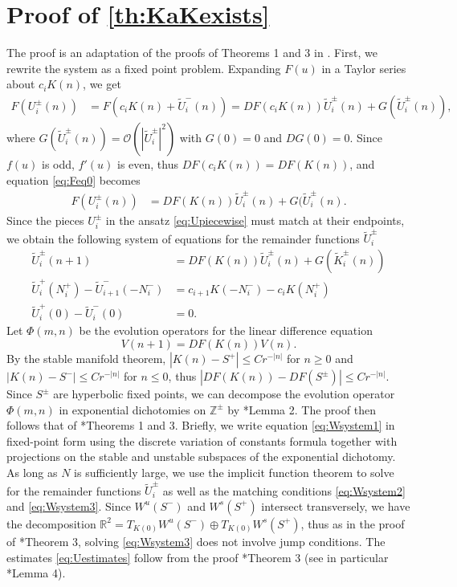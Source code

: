 \documentclass[12pt,reqno]{amsart}
\def\R{{\mathbb R}}
\def\Z{{\mathbb Z}}
\begin{document}
\appendix

\section{Proof of \cref{th:KaKexists}}\label{sec:proof1}

The proof is an adaptation of the proofs of Theorems 1 and 3 in \cite{Parker2020}. First, we rewrite the system as a fixed point problem. Expanding $F(u)$ in a Taylor series about $c_i K(n)$, we get
\begin{align}\label{eq:Feq0}
F(U_i^\pm(n)) &= F(c_i K(n) + \tilde{U}_i^-(n)) = 
D F(c_i K(n)) \tilde{U}_i^\pm(n) + G(\tilde{U}_i^\pm(n)),
\end{align}
where $G(\tilde{U}_i^\pm(n)) = \mathcal{O}(|\tilde{U}_i^\pm|^2)$ with $G(0) = 0$ and $DG(0) = 0$. Since $f(u)$ is odd, $f'(u)$ is even, thus $D F(c_i K(n)) = D F(K(n))$, and equation \cref{eq:Feq0} becomes
\begin{align}\label{eq:Feq1}
F(U_i^\pm(n)) &= 
D F(K(n)) \tilde{U}_i^\pm(n) + G(\tilde{U}_i^\pm(n).
\end{align}
Since the pieces $U_i^\pm$ in the ansatz \cref{eq:Upiecewise} must match at their endpoints, we obtain the following system of equations for the remainder functions $\tilde{U}_i^\pm$
\begin{align}
\tilde{U}_i^\pm(n+1) &= D F(K(n)) \tilde{U}_i^\pm(n) + G(\tilde{K}_i^\pm(n)) \label{eq:Wsystem1} \\
\tilde{U}_i^+(N_i^+) - \tilde{U}_{i+1}^-(-N_i^-) &= c_{i+1} K(-N_i^-) - c_i K(N_i^+) \label{eq:Wsystem2} \\
\tilde{U}_i^+(0) - \tilde{U}_i^-(0) &= 0.\label{eq:Wsystem3}
\end{align}
Let $\Phi(m, n)$ be the evolution operators for the linear difference equation 
\[
V(n+1) = D F(K(n)) V(n).
\]
By the stable manifold theorem, $|K(n) - S^+| \leq C r^{-|n|}$ for $n \geq 0$ and $|K(n) - S^-| \leq C r^{-|n|}$ for $n \leq 0$, thus $| DF(K(n)) - DF(S^\pm)| \leq C r^{-|n|}$. Since $S^\pm$ are hyperbolic fixed points, we can decompose the evolution operator $\Phi(m, n)$ in exponential dichotomies on $\Z^\pm$ by \cite{Parker2020}*{Lemma 2}. The proof then follows that of \cite{Parker2020}*{Theorems 1 and 3}. Briefly, we write equation \cref{eq:Wsystem1} in fixed-point form using the discrete variation of constants formula together with projections on the stable and unstable subspaces of the exponential dichotomy. As long as $N$ is sufficiently large, we use the implicit function theorem to solve for the remainder functions $\tilde{U}_i^\pm$ as well as the matching conditions \cref{eq:Wsystem2} and \cref{eq:Wsystem3}. Since $W^u(S^-)$ and $W^s(S^+)$ intersect transversely, we have the decomposition $\R^2 = T_{K(0)}W^u(S^-)\oplus T_{K(0)}W^s(S^+)$, thus as in the proof of \cite{Parker2020}*{Theorem 3}, solving \cref{eq:Wsystem3} does not involve jump conditions. The estimates \cref{eq:Uestimates} follow from the proof \cite{Parker2020}*{Theorem 3} (see in particular \cite{Parker2020}*{Lemma 4}).
\end{document}
